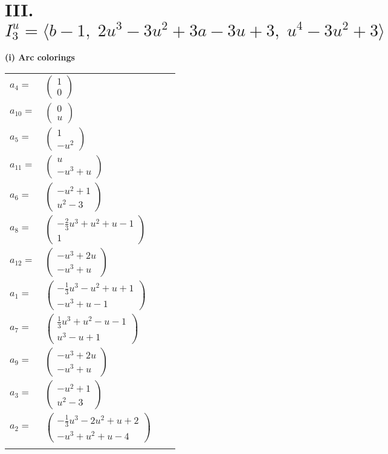 \documentclass[1p]{elsarticle_modified}
\theoremstyle{definition}
\begin{document}
\centering \section*{III. $I^u_{3}= \langle b-1,\;2 u^3-3 u^2+3 a-3 u+3,\;u^4-3 u^2+3 \rangle$}
\flushleft \textbf{(i) Arc colorings}\\
\begin{tabular}{m{7pt} m{180pt} m{7pt} m{180pt} }
\flushright $a_{4}=$&$\begin{pmatrix}1\\0\end{pmatrix}$ \\
\flushright $a_{10}=$&$\begin{pmatrix}0\\u\end{pmatrix}$ \\
\flushright $a_{5}=$&$\begin{pmatrix}1\\- u^2\end{pmatrix}$ \\
\flushright $a_{11}=$&$\begin{pmatrix}u\\- u^3+u\end{pmatrix}$ \\
\flushright $a_{6}=$&$\begin{pmatrix}- u^2+1\\u^2-3\end{pmatrix}$ \\
\flushright $a_{8}=$&$\begin{pmatrix}-\frac{2}{3} u^3+u^2+u-1\\1\end{pmatrix}$ \\
\flushright $a_{12}=$&$\begin{pmatrix}- u^3+2 u\\- u^3+u\end{pmatrix}$ \\
\flushright $a_{1}=$&$\begin{pmatrix}-\frac{1}{3} u^3- u^2+u+1\\- u^3+u-1\end{pmatrix}$ \\
\flushright $a_{7}=$&$\begin{pmatrix}\frac{1}{3} u^3+u^2- u-1\\u^3- u+1\end{pmatrix}$ \\
\flushright $a_{9}=$&$\begin{pmatrix}- u^3+2 u\\- u^3+u\end{pmatrix}$ \\
\flushright $a_{3}=$&$\begin{pmatrix}- u^2+1\\u^2-3\end{pmatrix}$ \\
\flushright $a_{2}=$&$\begin{pmatrix}-\frac{1}{3} u^3-2 u^2+u+2\\- u^3+u^2+u-4\end{pmatrix}$\\&\end{tabular}
\end{document}
